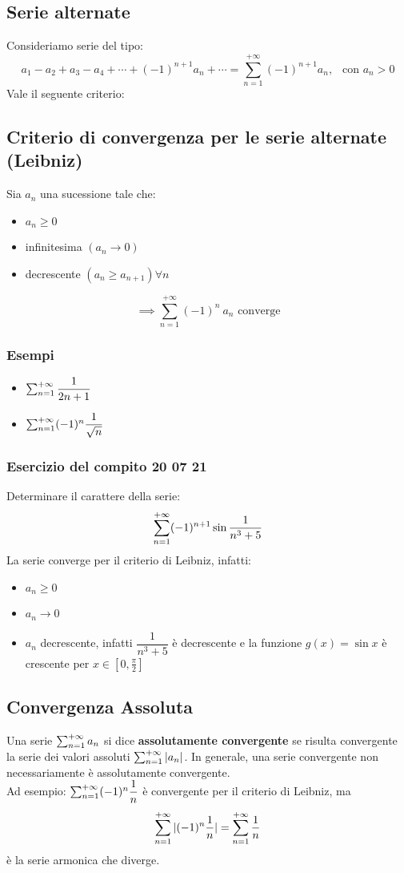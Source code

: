 \documentclass[../../main.tex]{subfiles}
\begin{document}
\subsection{Serie alternate}
Consideriamo serie del tipo:
\[
    a_1 - a_2 + a_3 - a_4 + \cdots + (-1)^{n+1}a_n + \cdots = \sum_{n=1}^{+\infty}(-1)^{n+1}a_n, \ \ \text{ con } a_n > 0
\]
Vale il seguente criterio:
\subsection{Criterio di convergenza per le serie alternate (Leibniz)}
Sia $a_n$ una sucessione tale che:
\begin{itemize}
    \item $a_n \geq 0$
    \item infinitesima $(a_n \to 0)$
    \item decrescente $(a_{n} \geq a_{n+1}) \forall n$
\end{itemize}
\[
    \implies \sum_{n = 1}^{+\infty} (-1)^{n}\ a_n \text{ converge}
\]

\subsubsection{Esempi}
\begin{itemize}
    \item $\sum_{n=1}^{+\infty} \dfrac{1}{2n+1}$
    \item $\sum_{n=1}^{+\infty} (-1)^n \dfrac{1}{\sqrt{n}}$
\end{itemize}

\subsubsection{Esercizio del compito 20 07 21}
Determinare il carattere della serie:
\[
    \sum_{n=1}^{+\infty} (-1)^{n+1}\sin\dfrac{1}{n^3+5}
\]
La serie converge per il criterio di Leibniz, infatti:
\begin{itemize}
    \item $a_n \geq 0$
    \item $a_n \to 0$
    \item $a_n$ decrescente, infatti $\dfrac{1}{n^3+5}$ è decrescente e la funzione $g(x) = \sin x$ è crescente per $x \in [0,\frac{\pi}{2}]$
\end{itemize}

\subsection{Convergenza Assoluta}
Una serie $\sum_{n=1}^{+\infty} a_n$ si dice \textbf{assolutamente convergente} se risulta
convergente la serie dei valori assoluti $\sum_{n=1}^{+\infty} |a_n|$. In generale, una serie
convergente non necessariamente è assolutamente convergente. \\ Ad esempio:
$\sum_{n=1}^{+\infty} (-1)^n \dfrac{1}{n}$ è convergente per il criterio di Leibniz, ma
\[
    \sum_{n=1}^{+\infty} |(-1)^n\dfrac{1}{n}| = \sum_{n=1}^{+\infty} \dfrac{1}{n}
\]
è la serie armonica che diverge.
\end{document}
